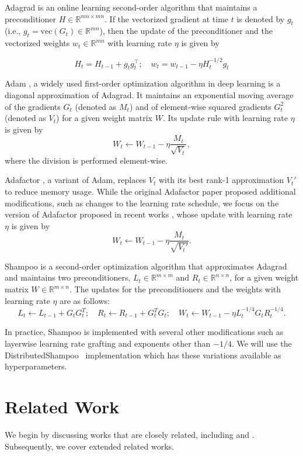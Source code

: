 \documentclass{article} %
\begin{document}
Adagrad \citep{adagrad} is an online learning second-order algorithm that maintains a preconditioner $H \in \mathbb{R}^{mn \times mn}$. If the vectorized gradient at time $t$ is denoted by $g_t$ (i.e., $g_t = \text{vec}(G_t) \in \mathbb{R}^{mn}$), then the update of the preconditioner and the vectorized weights $w_t \in \mathbb{R}^{mn}$ with learning rate $\eta$ is given by

\[ H_t = H_{t-1} + g_t g_t^\top; \quad w_t = w_{t-1} - \eta H_t^{-1/2} g_t \]

Adam \citep{adam}, a widely used first-order optimization algorithm in 
deep learning is a diagonal approximation of Adagrad. It maintains an exponential moving average of the gradients 
$G_t$ (denoted as $M_t$) and of element-wise squared gradients $G_t^2$ 
(denoted as $V_t$) for a given weight matrix $W$. Its update rule with 
learning rate $\eta$ is given by
\[
W_t \leftarrow W_{t-1} - \eta \frac{M_t}{\sqrt{V_t}},
\]
where the division is performed element-wise.

Adafactor \citep{adafactor, zhai}, a variant of Adam, replaces $V_t$ with 
its best rank-1 approximation $V_t'$ to reduce memory usage. While the 
original Adafactor paper \citep{adafactor} proposed additional modifications, 
such as changes to the learning rate schedule, we focus on the version of 
Adafactor proposed in recent works \citep{zhai, zhaoscience}, whose update 
with learning rate $\eta$ is given by
\[
W_t \leftarrow W_{t-1} - \eta \frac{M_t}{\sqrt{V_t'}}.
\]

Shampoo \citep{shampoo} is a second-order optimization algorithm that approximates Adagrad and maintains two preconditioners, $L_t \in \mathbb{R}^{m \times m}$ and $R_t \in \mathbb{R}^{n \times n}$, for a given weight matrix $W \in 
\mathbb{R}^{m \times n}$. The updates for the preconditioners and the 
weights with learning rate $\eta$ are as follows:
\[
L_t \leftarrow L_{t-1} + G_tG_t^T; \quad R_t \leftarrow R_{t-1} + G_t^TG_t; 
\quad W_t \leftarrow W_{t-1} - \eta L_t^{-1/4} G_t R_t^{-1/4}.
\]

In practice, Shampoo is implemented with several other modifications such as layerwise learning rate grafting and exponents other than $-1/4$. We will use the DistributedShampoo~\citep{distributedshampoo} implementation which has these variations available as hyperparameters.




\section{Related Work}
\label{sec:related}
We begin by discussing works that are closely related, including \citet{ekfac, 
anil2020scalable} and \citet{galore}. Subsequently, we  cover extended related works.
\end{document}
